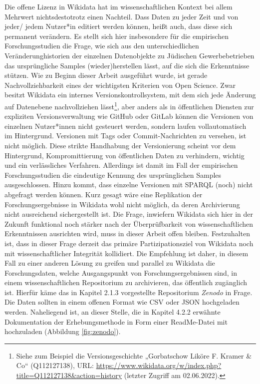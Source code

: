 Die offene Lizenz in Wikidata hat im wissenschaftlichen Kontext bei allem Mehrwert nichtsdestotrotz einen Nachteil. Dass Daten zu jeder Zeit und von jeder/ jedem Nutzer*in editiert werden können, heißt auch, dass diese sich permanent verändern. Es stellt sich hier insbesondere für die empirischen Forschungsstudien die Frage, wie sich aus den unterschiedlichen Veränderunghistorien der einzelnen Datenobjekte zu Jüdischen Gewerbebetrieben das ursprüngliche Samples (wieder)herstellen lässt, auf die sich die Erkenntnisse stützen. Wie zu Beginn dieser Arbeit ausgeführt wurde, ist gerade Nachvollziehbarkeit eines der wichtigsten Kriterien von Open Science. Zwar besitzt Wikidata ein internes Versionskontrollsystem, mit dem sich jede Änderung auf Datenebene nachvollziehen lässt\footnote{Siehe zum Beispiel die Versionsgeschichte „Gorbatschow Liköre F. Kramer \& Co“ (Q112127138), URL: \url{https://www.wikidata.org/w/index.php?title=Q112127138&action=history} (letzter Zugriff am 02.06.2022).}, aber anders als in öffentlichen Diensten zur expliziten Versionsverwaltung wie GitHub oder GitLab können die Versionen von einzelnen Nutzer*innen nicht gesteuert werden, sondern laufen vollautomatisch im Hintergrund. Versionen mit Tags oder Commit-Nachrichten zu versehen, ist nicht möglich. Diese strikte Handhabung der Versionierung scheint vor dem Hintergrund, Kompromittierung von öffentlichen Daten zu verhindern, wichtig und ein verlässliches Verfahren. Allerdings ist damit im Fall der empirischen Forschungsstudien die eindeutige Kennung des ursprünglichen Samples ausgeschlossen. Hinzu kommt, dass einzelne Versionen mit SPARQL (noch) nicht abgefragt werden können. Kurz gesagt wäre eine Replikation der Forschungsergebnisse in Wikidata wohl nicht möglich, da deren Archivierung nicht ausreichend sichergestellt ist. Die Frage, inwiefern Wikidata sich hier in der Zukunft funktional noch stärker nach der Überprüfbarkeit von wissenschaftlichen Erkenntnissen ausrichten wird, muss in dieser Arbeit offen bleiben. Festzuhalten ist, dass in dieser Frage derzeit das primäre Partizipationsziel von Wikidata noch mit wissenschaftlicher Integrität kollidiert. Die Empfehlung ist daher, in diesem Fall zu einer anderen Lösung zu greifen und parallel zu Wikidata die Forschungsdaten, welche Ausgangspunkt von Forschungsergebnissen sind, in einem wissenschaftlichen Repositorium zu archivieren, das öffentlich zugänglich ist. Hierfür käme das in Kapitel 2.1.3 vorgestellte Repositorium \textit{Zenodo} in Frage. Die Daten sollten in einem offenen Format wie CSV oder JSON hochgeladen werden. Naheliegend ist, an dieser Stelle, die in Kapitel 4.2.2 erwähnte Dokumentation der Erhebungsmethode in Form einer ReadMe-Datei mit hochzuladen (Abbildung \ref{fig:zenodo}).

